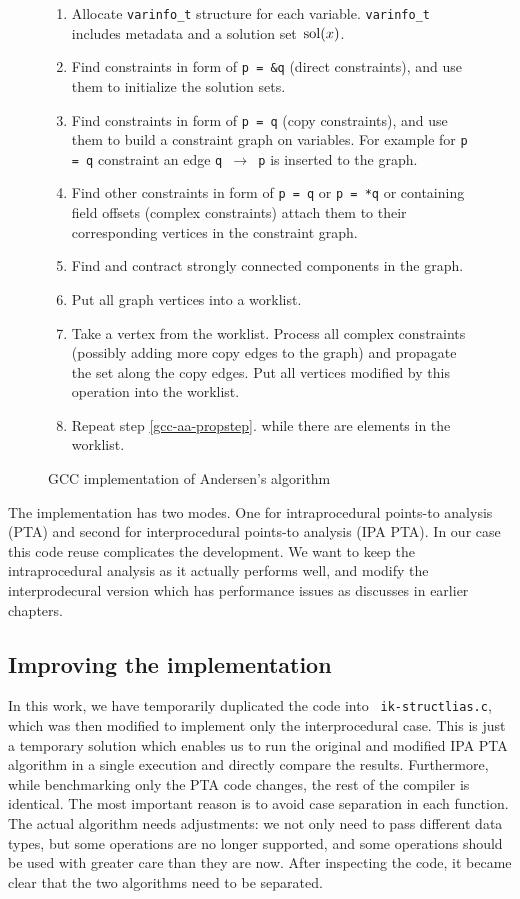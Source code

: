 \begin{figure}[!ht]
\begin{tcolorbox}
\begin{enumerate}
	\item Allocate {\tt varinfo\_t} structure for each variable. {\tt varinfo\_t} includes
		metadata and a solution set $\operatorname*{\,sol}(x)$.
	\item Find constraints in form of {\tt p = \&q} (direct constraints), and
		use them to initialize the solution sets.
	\item Find constraints in form of {\tt p = q} (copy constraints), and use
		them to build a constraint graph on variables. For example for {\tt p =
		q} constraint an edge {\tt q $\to$ p} is inserted to the graph.
	\item Find other constraints in form of {\tt *p = q} or {\tt p = *q} or
		containing field offsets (complex constraints) attach them to their
		corresponding vertices in the constraint graph.
	\item Find and contract strongly connected components in the graph.
	\item Put all graph vertices into a worklist.
	\item Take a vertex from the worklist. Process all complex constraints
		(possibly adding more copy edges to the graph) and propagate the set
		along the copy edges. Put all vertices modified by this operation into the
		worklist.
	\label{gcc-aa-propstep}
	\item Repeat step \ref{gcc-aa-propstep}. while there are elements in the worklist.
\end{enumerate}
\end{tcolorbox}
\caption{GCC implementation of Andersen's algorithm}
\label{figure-gcc-aliasalg}
\end{figure}

The implementation has two modes. One for intraprocedural points-to analysis
(PTA) and second for interprocedural points-to analysis (IPA PTA). In our case
this code reuse complicates the development. We want to keep the
intraprocedural analysis as it actually performs well, and modify the
interprodecural version which has performance issues as discusses in earlier
chapters.

\subsection{Improving the implementation}

In this work, we have temporarily duplicated the code into {\tt
ik-structlias.c}, which was then modified to implement only the interprocedural
case. This is just a temporary solution which enables us to run the original
and modified IPA PTA algorithm in a single execution and directly compare the
results. Furthermore, while benchmarking only the PTA code changes, the rest of
the compiler is identical.  The most important reason is to avoid case
separation in each function. The actual algorithm needs adjustments: we not
only need to pass different data types, but some operations are no longer
supported, and some operations should be used with greater care than they are
now. After inspecting the code, it became clear that the two algorithms need to
be separated.

